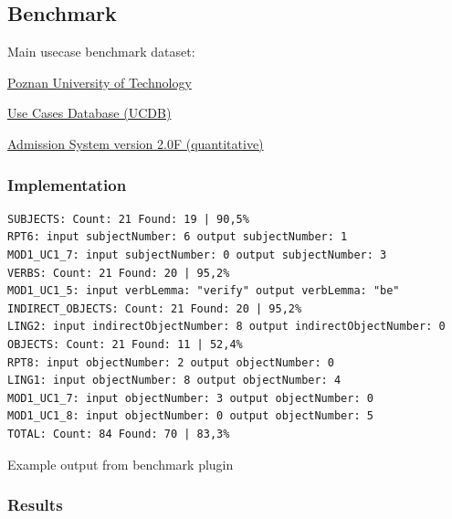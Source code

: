 \subsection{Benchmark}

Main usecase benchmark dataset:

\href{http://www2.put.poznan.pl/en}{Poznan University of Technology}

\href{http://www.se.cs.put.poznan.pl/knowledge-base/software-projects-database/use-cases-database-ucdb/use-cases-database-ucdb}{Use Cases Database (UCDB)}

\href{http://ucdb.cs.put.poznan.pl/benchmark/2.f.n/srs/index.html}{Admission System version 2.0F (quantitative)}


\subsubsection{Implementation}

\begin{table}[ht]   %
\begin{center}
    \begin{verbatim}
SUBJECTS: Count: 21 Found: 19 | 90,5%
RPT6: input subjectNumber: 6 output subjectNumber: 1
MOD1_UC1_7: input subjectNumber: 0 output subjectNumber: 3
VERBS: Count: 21 Found: 20 | 95,2%
MOD1_UC1_5: input verbLemma: "verify" output verbLemma: "be"
INDIRECT_OBJECTS: Count: 21 Found: 20 | 95,2%
LING2: input indirectObjectNumber: 8 output indirectObjectNumber: 0
OBJECTS: Count: 21 Found: 11 | 52,4%
RPT8: input objectNumber: 2 output objectNumber: 0
LING1: input objectNumber: 8 output objectNumber: 4
MOD1_UC1_7: input objectNumber: 3 output objectNumber: 0
MOD1_UC1_8: input objectNumber: 0 output objectNumber: 5
TOTAL: Count: 84 Found: 70 | 83,3%
    \end{verbatim}
  \caption{Example output from benchmark plugin}
  \label{tab.benchmarkexample}
\end{center}
\end{table}   
      
\subsubsection{Results}
                        
